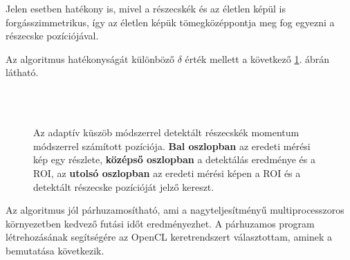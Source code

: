 	Jelen esetben hatékony is, mivel a részecskék és az életlen képül is forgásszimmetrikus, így az életlen képük tömegközéppontja
	meg fog egyezni a részecske pozíciójával.
	
	\noindent Az algoritmus hatékonyságát különböző $\delta$ érték mellett a következő \ref{fig:roi}. ábrán látható.
	
	\begin{figure}[!ht]
		\centering
		\\
		\\
		\caption[Pozíciómérés momentum módszerrel]{Az adaptív küszöb módszerrel detektált részecskék
		momentum módszerrel számított pozíciója. \textbf{Bal oszlopban} az eredeti mérési kép egy részlete, \textbf{középső oszlopban} a
		detektálás eredménye és a ROI, az \textbf{utolsó oszlopban} az eredeti mérési képen a ROI és a detektált
		részecske pozícióját jelző kereszt.}
		\label{fig:roi}
	\end{figure}
	
	\noindent
	\begin{center}
	Az algoritmus jól párhuzamosítható, ami a nagyteljesítményű multiprocesszoros
	környezetben kedvező futási időt eredményezhet. A párhuzamos program létrehozásának segítségére az 
	OpenCL keretrendszert választottam, aminek a bemutatása következik.
	\end{center}





